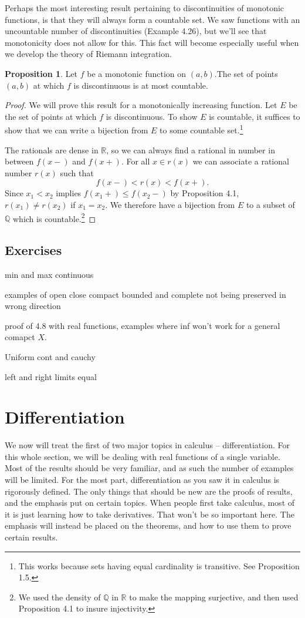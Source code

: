 \documentclass{article}
\newcommand{\R}{\mathbb{R}}
\newcommand{\Q}{\mathbb{Q}}
\theoremstyle{definition}
\newtheorem{proposition}{Proposition}[section]
\begin{document}
Perhaps the most interesting result pertaining to discontinuities of monotonic functions, is that they will always form a countable set. We saw functions with an uncountable number of discontinuities (Example 4.26), but we'll see that monotonicity does not allow for this. This fact will become especially useful when we develop the theory of Riemann integration.
\begin{proposition}
	Let $ f $ be a monotonic function on $ (a,b) $.The set of points $ (a,b) $ at which $ f $ is discontinuous is at most countable. 
\end{proposition}
\begin{proof}
	We will prove this result for a monotonically increasing function. Let $ E $ be the set of points at which $ f $ is discontinuous. To show $ E $ is countable, it suffices to show that we can write a bijection from $ E $ to some countable set.\footnote{This works because sets having equal cardinality is transitive. See Proposition 1.5.}
	
	The rationals are dense in $ \R $, so we can always find a rational in number in between $ f(x-) $ and $ f(x+) $. For all $ x\in r(x) $ we can associate a rational number $ r(x) $ such that $$  f(x-)<r(x)<f(x+).$$ Since $ x_1<x_2 $ implies $ f(x_1+)\le f(x_2-)  $ by Proposition 4.1, $ r(x_1)\neq r(x_2) $ if $ x_1=x_2 $. We therefore have a bijection from $ E $ to a subset of $ \Q $ which is countable.\footnote{We used the density of $ \Q $ in $ \R $ to make the mapping surjective, and then used Proposition 4.1 to insure injectivity.}
\end{proof}
\subsection{Exercises}
min and max continuous

examples of open close compact bounded and complete not being preserved in wrong direction

proof of 4.8 with real functions, examples where inf won't work for a general comapct $ X $. 

Uniform cont and cauchy

left and right limits equal
\newpage
\section{Differentiation}
We now will treat the first of two major topics in calculus -- differentiation. For this whole section, we will be dealing with real functions of a single variable. Most of the results should be very familiar, and as such the number of examples will be limited. For the most part, differentiation as you saw it in calculus is rigorously defined. The only things that should be new are the proofs of results, and the emphasis put on certain topics. When people first take calculus, most of it is just learning how to take derivatives. That won't be so important here. The emphasis will instead be placed on the theorems, and how to use them to prove certain results.    
\end{document}
